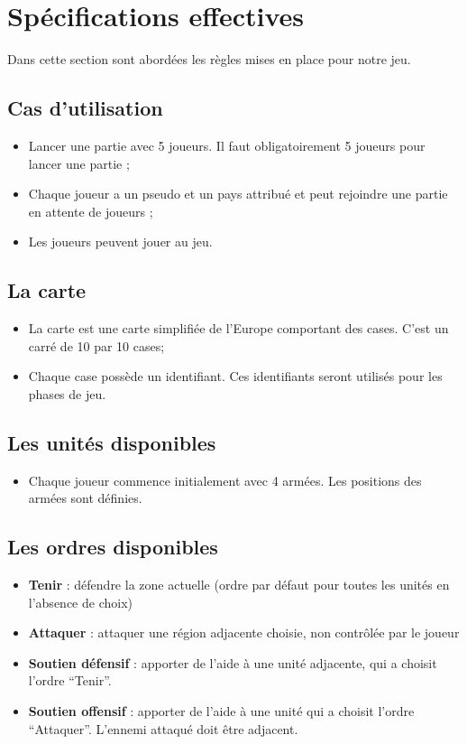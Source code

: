 \section{Spécifications effectives}
	Dans cette section sont abordées les règles mises en place pour notre jeu.

	\subsection{Cas d'utilisation}
		\begin{itemize}
			\item Lancer une partie avec 5 joueurs. Il faut obligatoirement 5 joueurs pour lancer une partie ;
			\item Chaque joueur a un pseudo et un pays attribué et peut rejoindre une partie en attente de joueurs ;
			\item Les joueurs peuvent jouer au jeu.
		\end{itemize}

	\subsection{La carte}
		\begin{itemize}
			\item La carte est une carte simplifiée de l'Europe comportant des cases. C'est un carré de 10 par 10 cases;
			\item Chaque case possède un identifiant. Ces identifiants seront utilisés pour les phases de jeu.
		\end{itemize}

	\subsection{Les unités disponibles}
		\begin{itemize}
			\item Chaque joueur commence initialement avec 4 armées. Les positions des armées sont définies.
		\end{itemize}

	\subsection{Les ordres disponibles}
		\begin{itemize}
			\item \textbf{Tenir} : défendre la zone actuelle (ordre par défaut pour toutes les unités en l'absence de choix)
			\item \textbf{Attaquer} : attaquer une région adjacente choisie, non contrôlée par le joueur
			\item \textbf{Soutien défensif} : apporter de l'aide à une unité adjacente, qui a choisit l'ordre \enquote{Tenir}.
			\item \textbf{Soutien offensif} : apporter de l'aide à une unité qui a choisit l'ordre \enquote{Attaquer}. L'ennemi attaqué doit être adjacent.
		\end{itemize}


